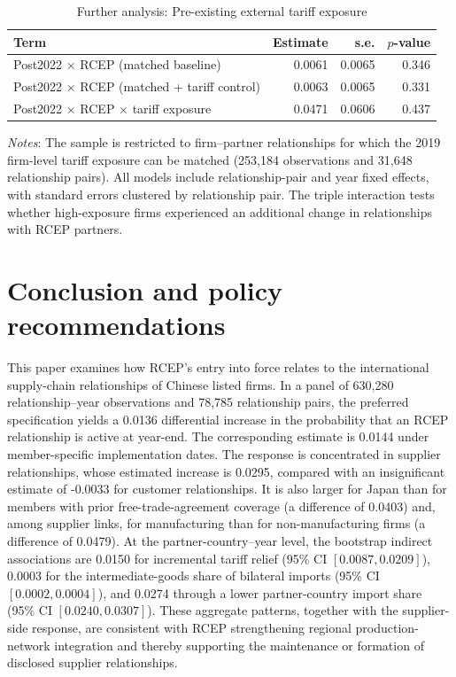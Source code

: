 \documentclass[preprint,12pt,authoryear]{elsarticle}
\begin{document}
\begin{table}[H]
\centering
\caption{Further analysis: Pre-existing external tariff exposure}
\label{tab:tariffalternative}
\small
\begin{threeparttable}
\begin{tabular}{lrrr}
\toprule
Term & Estimate & s.e. & $p$-value \\
\midrule
Post2022 $\times$ RCEP (matched baseline) & 0.0061 & 0.0065 & 0.346 \\
Post2022 $\times$ RCEP (matched + tariff control) & 0.0063 & 0.0065 & 0.331 \\
Post2022 $\times$ RCEP $\times$ tariff exposure & 0.0471 & 0.0606 & 0.437 \\
\bottomrule
\end{tabular}
\begin{tablenotes}[flushleft]
\item
\footnotesize \textit{Notes}: The sample is restricted to firm--partner relationships for which the 2019 firm-level tariff exposure can be matched (253,184 observations and 31,648 relationship pairs). All models include relationship-pair and year fixed effects, with standard errors clustered by relationship pair. The triple interaction tests whether high-exposure firms experienced an additional change in relationships with RCEP partners.
\end{tablenotes}
\end{threeparttable}
\end{table}
 
\section{Conclusion and policy recommendations}
\label{sec:conclusion}

This paper examines how RCEP's entry into force relates to the international supply-chain relationships of Chinese listed firms. In a panel of 630,280 relationship--year observations and 78,785 relationship pairs, the preferred specification yields a 0.0136 differential increase in the probability that an RCEP relationship is active at year-end. The corresponding estimate is 0.0144 under member-specific implementation dates. The response is concentrated in supplier relationships, whose estimated increase is 0.0295, compared with an insignificant estimate of -0.0033 for customer relationships. It is also larger for Japan than for members with prior free-trade-agreement coverage (a difference of 0.0403) and, among supplier links, for manufacturing than for non-manufacturing firms (a difference of 0.0479). At the partner-country--year level, the bootstrap indirect associations are 0.0150 for incremental tariff relief (95\% CI $[0.0087,0.0209]$), 0.0003 for the intermediate-goods share of bilateral imports (95\% CI $[0.0002,0.0004]$), and 0.0274 through a lower partner-country import share (95\% CI $[0.0240,0.0307]$). These aggregate patterns, together with the supplier-side response, are consistent with RCEP strengthening regional production-network integration and thereby supporting the maintenance or formation of disclosed supplier relationships.
\end{document}
